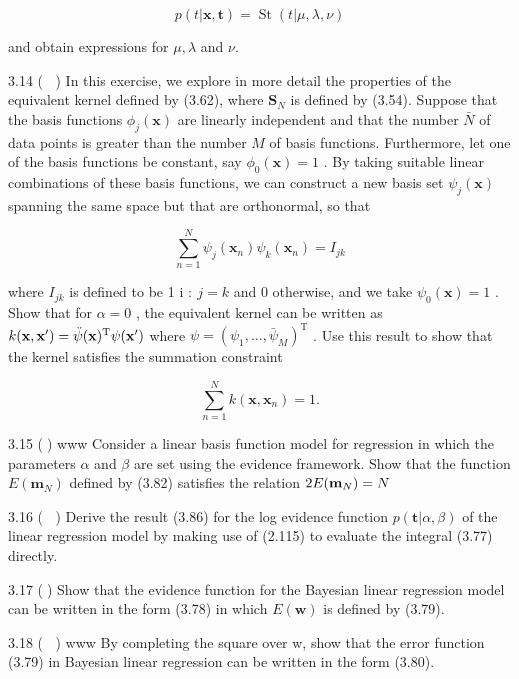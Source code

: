 \documentclass[
  10
]{article}
\begin{document}
\[
p (t | \mathbf {x}, \mathbf {t}) = \operatorname{St} (t | \mu , \lambda , \nu)\tag{3.114}
\]

and obtain expressions for \(\mu , \lambda\) and \(\nu .\)

3.14 ( ) In this exercise, we explore in more detail the properties of
the equivalent kernel defined by (3.62), where \(\mathbf { S } _ { N }\)
is defined by (3.54). Suppose that the basis functions
\(\phi _ { j } ( \mathbf { x } )\) are linearly independent and that the
number \(\bar { N }\) of data points is greater than the number \(M\) of
basis functions. Furthermore, let one of the basis functions be
constant, say \(\phi _ { 0 } ( \mathbf { x } ) = 1\) . By taking
suitable linear combinations of these basis functions, we can construct
a new basis set \(\psi _ { j } ( \mathbf { x } )\) spanning the same
space but that are orthonormal, so that

\[
\sum_ {n = 1} ^ {N} \psi_ {j} (\mathbf {x} _ {n}) \psi_ {k} (\mathbf {x} _ {n}) = I _ {j k}\tag{3.115}
\]

where \(I _ { j k }\) is defined to be 1 i \({ \mathrm { : ~ } } j = k\)
and 0 otherwise, and we take \(\psi _ { 0 } ( \mathbf { x } ) = 1\) .
Show that for \(\alpha = 0\) , the equivalent kernel can be written as
\(k ( { \bf x } , { \bf x } ^ { \prime } ) = \ddot { \psi } ( { \bf x } ) ^ { \mathrm { T } } \psi ( { \bf x } ^ { \prime } )\)
where
\(\psi = ( \psi _ { 1 } , \ldots , \bar { \psi } _ { M } ) ^ { \mathrm { T } }\)
. Use this result to show that the kernel satisfies the summation
constraint

\[
\sum_ {n = 1} ^ {N} k (\mathbf {x}, \mathbf {x} _ {n}) = 1.\tag{3.116}
\]

3.15 () www Consider a linear basis function model for regression in
which the parameters \(\alpha\) and \(\beta\) are set using the evidence
framework. Show that the function \(E ( \mathbf { m } _ { N } )\)
defined by (3.82) satisfies the relation
\(2 E ( { \bf m } _ { N } ) = N\)

3.16 ( ) Derive the result (3.86) for the log evidence function
\(p ( \mathbf { t } | \alpha , \beta )\) of the linear regression model
by making use of (2.115) to evaluate the integral (3.77) directly.

3.17 () Show that the evidence function for the Bayesian linear
regression model can be written in the form (3.78) in which
\(E ( \mathbf { w } )\) is defined by (3.79).

3.18 ( ) www By completing the square over w, show that the error
function (3.79) in Bayesian linear regression can be written in the form
(3.80).
\end{document}

